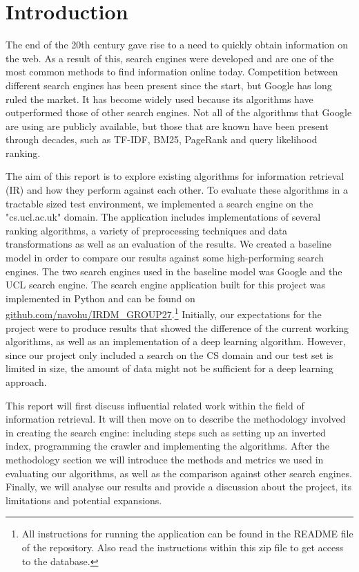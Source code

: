 \section{Introduction}

The end of the 20th century gave rise to a need to quickly obtain information on the web. As a result of this, search engines were developed and are one of the most common methods to find information online today. Competition between different search engines has been present since the start, but Google has long ruled the market. It has become widely used because its algorithms have outperformed those of other search engines. Not all of the algorithms that Google are using are publicly available, but those that are known have been present through decades, such as TF-IDF, BM25, PageRank and query likelihood ranking.

The aim of this report is to explore existing algorithms for information retrieval (IR) and how they perform against each other. To evaluate these algorithms in a tractable sized test environment, we implemented a search engine on the "cs.ucl.ac.uk" domain. The application includes implementations of several ranking algorithms, a variety of preprocessing techniques and data transformations as well as an evaluation of the results. We created a baseline model in order to compare our results against some high-performing search engines. The two search engines used in the baseline model was Google and the UCL search engine. The search engine application built for this project was implemented in Python and can be found on \url{github.com/navohu/IRDM_GROUP27}.\footnote{All instructions for running the application can be found in the README file of the repository. Also read the instructions within this zip file to get access to the database.} Initially, our expectations for the project were to produce results that showed the difference of the current working algorithms, as well as an implementation of a deep learning algorithm. However, since our project only included a search on the CS domain and our test set is limited in size, the amount of data might not be sufficient for a deep learning approach.

This report will first discuss influential related work within the field of information retrieval. It will then move on to describe the methodology involved in creating the search engine: including steps such as setting up an inverted index, programming the crawler and implementing the algorithms. After the methodology section we will introduce the methods and metrics we used in evaluating our algorithms, as well as the comparison against other search engines. Finally, we will analyse our results and provide a discussion about the project, its limitations and potential expansions.

